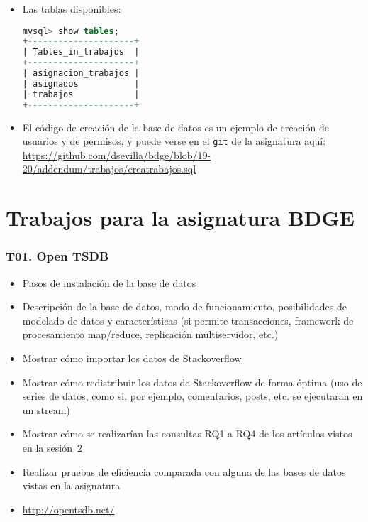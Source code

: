 \begin{frame}
\begin{itemize}
\framebreak

\item Las tablas disponibles:
%
\begin{lstlisting}[language=sql]
mysql> show tables;
+---------------------+
| Tables_in_trabajos  |
+---------------------+
| asignacion_trabajos |
| asignados           |
| trabajos            |
+---------------------+
\end{lstlisting}

\item El código de creación de la base de datos es un ejemplo de creación
  de usuarios y de permisos, y puede verse en el {\tt git} de la asignatura
  aquí:
  \url{https://github.com/dsevilla/bdge/blob/19-20/addendum/trabajos/creatrabajos.sql}

\end{itemize}


\end{frame}

\section{Trabajos para la asignatura BDGE}

\begin{frame}
  \frametitle{T01. Open TSDB}
  \begin{itemize}
  \item Pasos de instalación de la base de datos
  \item Descripción de la base de datos, modo de funcionamiento,
    posibilidades de modelado de datos y características (si permite
    transacciones, framework de procesamiento map/reduce, replicación
    multiservidor, etc.)
  \item Mostrar cómo importar los datos de Stackoverflow
  \item Mostrar cómo redistribuir los datos de Stackoverflow de forma
    óptima (uso de series de datos, como si, por ejemplo, comentarios,
    posts, etc. se ejecutaran en un stream)
  \item Mostrar cómo se realizarían las consultas RQ1 a RQ4 de los
    artículos vistos en la sesión~2
  \item Realizar pruebas de eficiencia comparada con alguna de las bases de
    datos vistas en la asignatura
  \item \url{http://opentsdb.net/}
  \end{itemize}
\end{frame}


